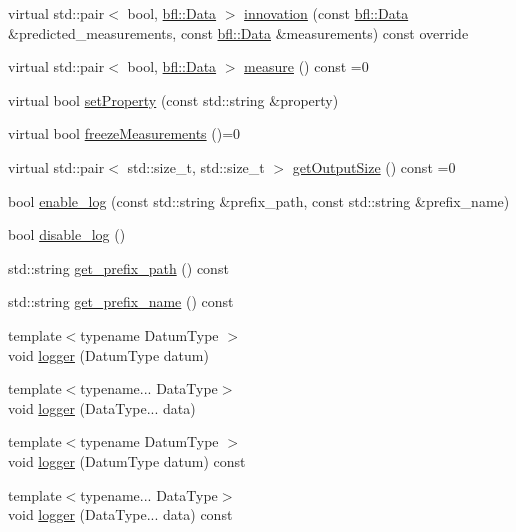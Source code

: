\begin{DoxyCompactItemize}
\item 
virtual std\+::pair$<$ bool, \mbox{\hyperlink{namespacebfl_af6b103c6821db1b54452f776fdd9dd02}{bfl\+::\+Data}} $>$ \mbox{\hyperlink{classbfl_1_1LinearMeasurementModel_a12485b4b6d511e97e338a4db6861b277}{innovation}} (const \mbox{\hyperlink{namespacebfl_af6b103c6821db1b54452f776fdd9dd02}{bfl\+::\+Data}} \&predicted\+\_\+measurements, const \mbox{\hyperlink{namespacebfl_af6b103c6821db1b54452f776fdd9dd02}{bfl\+::\+Data}} \&measurements) const override
\item 
virtual std\+::pair$<$ bool, \mbox{\hyperlink{namespacebfl_af6b103c6821db1b54452f776fdd9dd02}{bfl\+::\+Data}} $>$ \mbox{\hyperlink{classbfl_1_1MeasurementModel_ad372b720cef4e6bc0ac2489f4098bfc9}{measure}} () const =0
\item 
virtual bool \mbox{\hyperlink{classbfl_1_1MeasurementModel_af97e18b52d1a3f365dd5982b8cc4aff7}{set\+Property}} (const std\+::string \&property)
\item 
virtual bool \mbox{\hyperlink{classbfl_1_1MeasurementModel_a67ef096c5b3682252582aec75498089d}{freeze\+Measurements}} ()=0
\item 
virtual std\+::pair$<$ std\+::size\+\_\+t, std\+::size\+\_\+t $>$ \mbox{\hyperlink{classbfl_1_1MeasurementModel_a6cca2022b576c9dbb61e73b83a10c6ee}{get\+Output\+Size}} () const =0
\item 
bool \mbox{\hyperlink{classbfl_1_1Logger_ae94b97b6e8d7902e8ce048384813122e}{enable\+\_\+log}} (const std\+::string \&prefix\+\_\+path, const std\+::string \&prefix\+\_\+name)
\item 
bool \mbox{\hyperlink{classbfl_1_1Logger_a440467a28ccc46490d767fe0ef6f556a}{disable\+\_\+log}} ()
\item 
std\+::string \mbox{\hyperlink{classbfl_1_1Logger_a56cf1a4e712bf23d9978420a8a59a62b}{get\+\_\+prefix\+\_\+path}} () const
\item 
std\+::string \mbox{\hyperlink{classbfl_1_1Logger_a913a795b7bfbf378815eeb342d68a7c0}{get\+\_\+prefix\+\_\+name}} () const
\item 
{\footnotesize template$<$typename Datum\+Type $>$ }\\void \mbox{\hyperlink{classbfl_1_1Logger_a1033ff31398484f2132f84fd140da9e3}{logger}} (Datum\+Type datum)
\item 
{\footnotesize template$<$typename... Data\+Type$>$ }\\void \mbox{\hyperlink{classbfl_1_1Logger_aca2086c9256e5c404872b91f7f25b97d}{logger}} (Data\+Type... data)
\item 
{\footnotesize template$<$typename Datum\+Type $>$ }\\void \mbox{\hyperlink{classbfl_1_1Logger_a50b1c109730fa98f66e66f420f0158fe}{logger}} (Datum\+Type datum) const
\item 
{\footnotesize template$<$typename... Data\+Type$>$ }\\void \mbox{\hyperlink{classbfl_1_1Logger_a0f0cf7ce956546d94dfb1feb7cebf171}{logger}} (Data\+Type... data) const
\end{DoxyCompactItemize}
